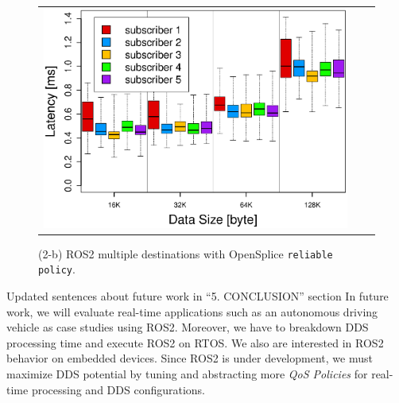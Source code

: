\documentclass{article}
\begin{document}
\begin{enumerate}
\begin{figure}[h]
\begin{tabular}{ccc}
\begin{minipage}[t]{0.31\textwidth}
        \includegraphics[width=1.0\linewidth]{../../figure/BoxPlot_ospl_128K_multi-pub5.eps}
        \caption{(2-b) ROS2 multiple destinations with OpenSplice \texttt{reliable policy}.}
        \label{fig:ospl_multi_128K}
      \end{minipage}
    \end{tabular}
  \end{figure}
  \begin{itembox}[|]{Updated sentences about future work in ``5. CONCLUSION'' section}
    In future work, we will evaluate real-time applications such as an autonomous driving vehicle as case studies using ROS2. 
    Moreover, we have to breakdown DDS processing time and execute ROS2 on RTOS.
    We also are interested in ROS2 behavior on embedded devices.
    Since ROS2 is under development, we must maximize DDS potential by tuning and abstracting more \emph{QoS Policies} for real-time processing and DDS configurations.
  \end{itembox}\\

\end{enumerate}

\newpage





\end{document}

